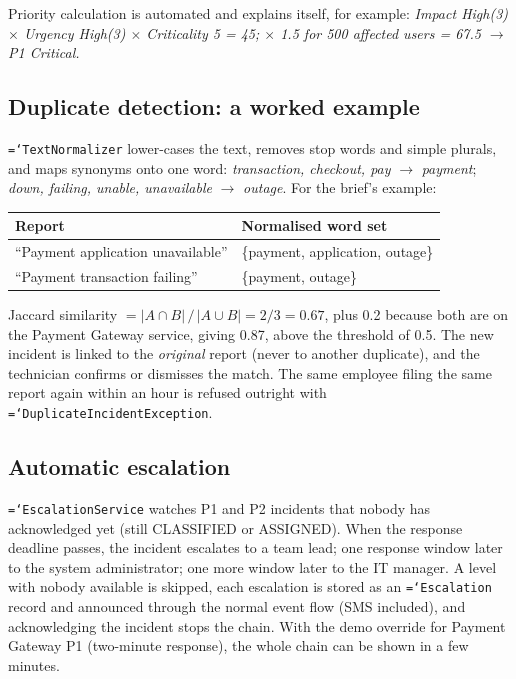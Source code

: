 \documentclass[11pt,a4paper]{article}
\newcommand{\code}[1]{\texttt{\hyphenchar\font=`\-\relax #1}}
\begin{document}
Priority calculation is automated and explains itself, for example: \textit{Impact High(3) $\times$ Urgency High(3) $\times$ Criticality 5 = 45; $\times$ 1.5 for 500 affected users = 67.5 $\rightarrow$ P1 Critical.}

\subsection{Duplicate detection: a worked example}
\code{TextNormalizer} lower-cases the text, removes stop words and simple plurals, and maps synonyms onto one word: \textit{transaction, checkout, pay} $\rightarrow$ \textit{payment}; \textit{down, failing, unable, unavailable} $\rightarrow$ \textit{outage}. For the brief's example:

\begin{tabularx}{\linewidth}{@{}L{5.4cm}Y@{}}
\toprule
\textbf{Report} & \textbf{Normalised word set} \\
\midrule
``Payment application unavailable'' & \{payment, application, outage\} \\
``Payment transaction failing'' & \{payment, outage\} \\
\bottomrule
\end{tabularx}

Jaccard similarity $= |A \cap B| \,/\, |A \cup B| = 2/3 = 0.67$, plus 0.2 because both are on the Payment Gateway service, giving 0.87, above the threshold of 0.5. The new incident is linked to the \emph{original} report (never to another duplicate), and the technician confirms or dismisses the match. The same employee filing the same report again within an hour is refused outright with \code{DuplicateIncidentException}.

\subsection{Automatic escalation}
\code{EscalationService} watches P1 and P2 incidents that nobody has acknowledged yet (still CLASSIFIED or ASSIGNED). When the response deadline passes, the incident escalates to a team lead; one response window later to the system administrator; one more window later to the IT manager. A level with nobody available is skipped, each escalation is stored as an \code{Escalation} record and announced through the normal event flow (SMS included), and acknowledging the incident stops the chain. With the demo override for Payment Gateway P1 (two-minute response), the whole chain can be shown in a few minutes.
\end{document}
